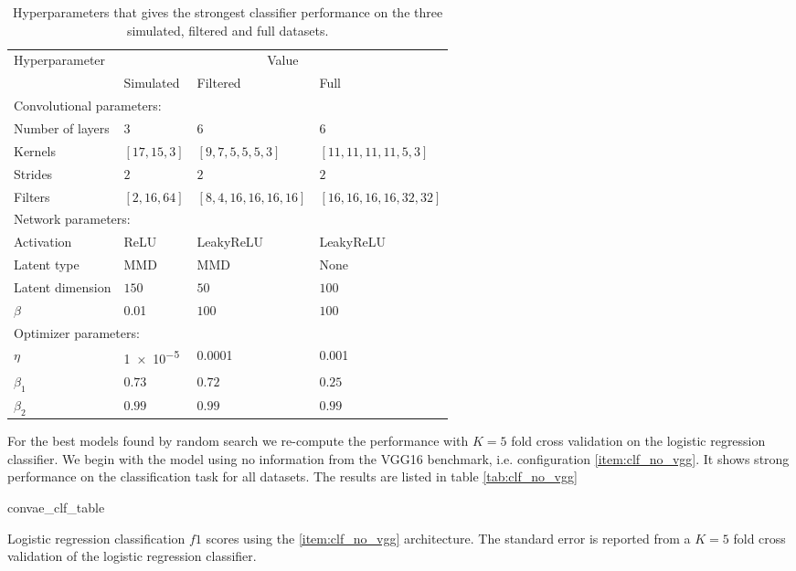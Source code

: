 \begin{table}
\centering
\caption{Hyperparameters that gives the strongest classifier performance on the three simulated, filtered and full datasets.}\label{tab:best_params_clf_convae}
\setlength{\extrarowheight}{15pt}
\hspace*{-0.5in}
\begin{tabular}{llll}
\toprule
Hyperparameter & \multicolumn{3}{c}{Value} \\
& Simulated & Filtered & Full \\
\midrule
\multicolumn{4}{l}{Convolutional parameters: } \\
\midrule
Number of layers & 3 & 6 & 6\\
Kernels & $[17, 15, 3]$ & $[9, 7, 5, 5, 5, 3]$ & $[11, 11, 11, 11, 5, 3]$ \\
Strides & $2$ & $2$ & $2$ \\
Filters & $[2, 16, 64]$ & $[8, 4, 16, 16, 16, 16]$ & $[16, 16, 16, 16, 32, 32]$ \\ 
\midrule
\multicolumn{4}{l}{Network parameters: } \\
\midrule
Activation & ReLU & LeakyReLU & LeakyReLU \\
Latent type & MMD & MMD & None \\
Latent dimension & $150$ & $50$ & $100$ \\
$\beta$ & \num{0.01} & $100$ & $ 100$  \\
\midrule
\multicolumn{4}{l}{Optimizer parameters: } \\
\midrule
$\eta$ &  \num{1e-5} & \num{0.0001} & \num{0.001} \\
$\beta_1$ & $0.73$ & $0.72$ & $0.25$ \\
$\beta_2$ & $0.99$ & $0.99$ & $0.99$ \\
\bottomrule
\end{tabular}
\end{table}

For the best models found by random search we re-compute the performance with $K=5$ fold cross validation on the logistic regression classifier. We begin with the model using no information from the VGG16 benchmark, i.e. configuration \ref{item:clf_no_vgg}. It shows strong performance on the classification task for all datasets. The results are listed in table \ref{tab:clf_no_vgg}

\begin{table}
\centering
{convae_clf_table}
\caption{Logistic regression classification $f1$ scores using the \ref{item:clf_no_vgg} architecture. The standard error is reported from a $K=5$ fold cross validation of the logistic regression classifier.}\label{tab:clf_no_vgg}
\end{table}

